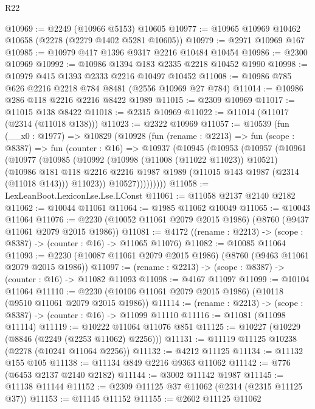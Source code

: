 \begin{lexlean}{R22}
\begin{coremodule}
@10969 := @2249 (@10966 @5153) @10605
@10977 := @10965 @10969 @10462 @10658 (@2278 (@2279 @1402 @5281 @10605))
@10979 := @2971 @10969 @167
@10985 := @10979 @417 @1396 @9317 @2216 @10484 @10454
@10986 := @2300 @10969
@10992 := @10986 @1394 @183 @2335 @2218 @10452 @1990
@10998 := @10979 @415 @1393 @2333 @2216 @10497 @10452
@11008 := @10986 @785 @626 @2216 @2218 @784 @8481 (@2556 @10969 @27 @784)
@11014 := @10986 @286 @118 @2216 @2216 @8422 @1989
@11015 := @2309 @10969
@11017 := @11015 @138 @8422
@11018 := @2315 @10969
@11022 := @11014 (@11017 (@2314 (@11018 @138)))
@11023 := @2322 @10969
@11057 := @10539
    (fun (__x0 : @1977) =>
    @10829
      (@10928
        (fun (rename : @2213) =>
        fun (scope : @8387) =>
        fun (counter : @16) =>
        @10937
          (@10945
            (@10953
              (@10957
                (@10961
                  (@10977
                    (@10985
                      (@10992
                        (@10998 (@11008 (@11022 @11023)) @10521)
                        (@10986
                          @181
                          @118
                          @2216
                          @2216
                          @1987
                          @1989
                          (@11015 @143 @1987 (@2314 (@11018 @143)))
                          @11023))
                      @10527)))))))))
@11058 := LexLeanBoot.LexiconLse.Lse.LConst
@11061 := @11058 @2137 @2140 @2182
@11062 := @10044 @11061
@11064 := @1985 @11062 @10049
@11065 := @10043 @11064
@11076 := @2230 (@10052 @11061 @2079 @2015 @1986) (@8760 (@9437 @11061 @2079 @2015 @1986))
@11081 := @4172 ((rename : @2213) -> (scope : @8387) -> (counter : @16) -> @11065 @11076)
@11082 := @10085 @11064
@11093 := @2230 (@10087 @11061 @2079 @2015 @1986) (@8760 (@9463 @11061 @2079 @2015 @1986))
@11097 := (rename : @2213) -> (scope : @8387) -> (counter : @16) -> @11082 @11093
@11098 := @4167 @11097
@11099 := @10104 @11064
@11110 := @2230 (@10106 @11061 @2079 @2015 @1986) (@10118 (@9510 @11061 @2079 @2015 @1986))
@11114 := (rename : @2213) -> (scope : @8387) -> (counter : @16) -> @11099 @11110
@11116 := @11081 (@11098 @11114)
@11119 := @10222 @11064 @11076 @851
@11125 := @10227 (@10229 (@8846 (@2249 (@2253 @11062) @2256)))
@11131 := @11119 @11125 @10238 (@2278 (@10241 @11064 @2256))
@11132 := @4212 @11125
@11134 := @11132 @155 @105
@11138 := @11134 @849 @2216 @9363 @11062
@11142 := @776 (@6453 @2137 @2140 @2182)
@11144 := @3002 @11142 @1987
@11145 := @11138 @11144
@11152 := @2309 @11125 @37 @11062 (@2314 (@2315 @11125 @37))
@11153 := @11145 @11152
@11155 := @2602 @11125 @11062

\end{coremodule}
\end{lexlean}

